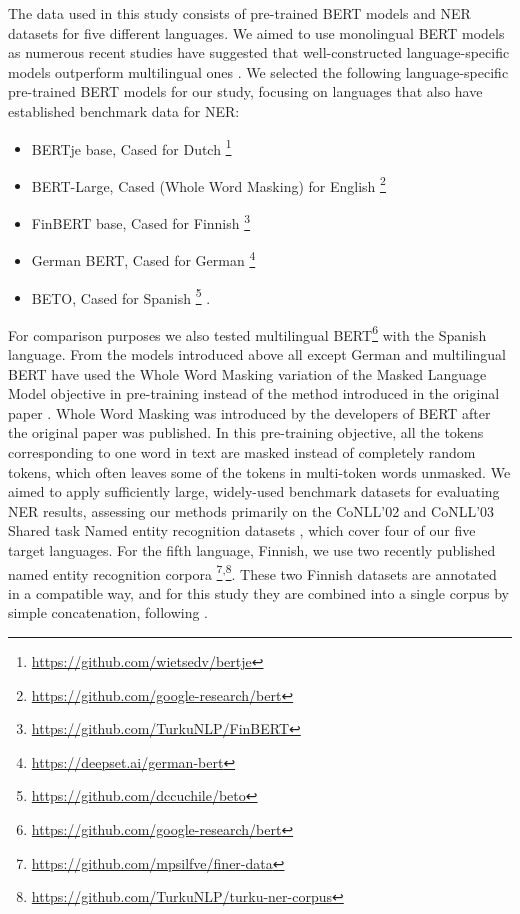 \documentclass[11pt]{article}
\begin{document}
The data used in this study consists of pre-trained BERT models and NER datasets for five different languages. We aimed to use monolingual BERT models as numerous recent studies have suggested that well-constructed language-specific models outperform multilingual ones \cite{virtanen2019multilingual,vries_bertje_2019,le2020flaubert}.
We selected the following language-specific pre-trained BERT models for our study, focusing on languages that also have established benchmark data for NER:
\begin{itemize}
\item BERTje base, Cased for Dutch \cite{vries_bertje_2019}\footnote{\url{https://github.com/wietsedv/bertje}}
\item BERT-Large, Cased (Whole Word Masking) for English \footnote{\url{https://github.com/google-research/bert}}
\item FinBERT base, Cased for Finnish \cite{virtanen2019multilingual}\footnote{\url{https://github.com/TurkuNLP/FinBERT}}
\item German BERT, Cased for German \footnote{\url{https://deepset.ai/german-bert}}
\item BETO, Cased for Spanish \cite{CaneteCFP2020}\footnote{\url{https://github.com/dccuchile/beto}} .
\end{itemize}
For comparison purposes we also tested multilingual BERT\footnote{\url{https://github.com/google-research/bert}} with the Spanish language. From the models introduced above all except German and multilingual BERT have used the Whole Word Masking variation of the Masked Language Model objective in pre-training instead of the method introduced in the original paper \cite{devlin2018bert}. Whole Word Masking was introduced by the developers of BERT after the original paper was published. In this pre-training objective, all the tokens corresponding to one word in text are masked instead of completely random tokens, which often leaves some of the tokens in multi-token words unmasked.       
We aimed to apply sufficiently large, widely-used benchmark datasets for evaluating NER results, assessing our methods primarily on the CoNLL'02 and CoNLL'03 Shared task Named entity recognition datasets \cite{Tjong_Kim_Sang_2002,Tjong_Kim_Sang_2003}, which cover four of our five target languages. For the fifth language, Finnish, we use two recently published named entity recognition corpora \cite{ruokolainen2019finnish,luoma-EtAl:2020:LREC}\footnote{\url{https://github.com/mpsilfve/finer-data}}\textsuperscript{,}\footnote{ \url{https://github.com/TurkuNLP/turku-ner-corpus}}. These two Finnish datasets are annotated in a compatible way, and for this study they are combined into a single corpus by simple concatenation, following .
\end{document}
